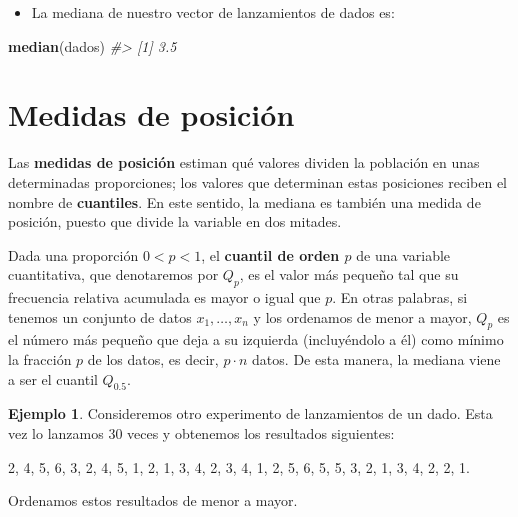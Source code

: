 \documentclass[
]{book}
\newenvironment{Shaded}{\begin{snugshade}}{\end{snugshade}}
\newcommand{\CommentTok}[1]{\textcolor[rgb]{0.56,0.35,0.01}{\textit{#1}}}
\newcommand{\KeywordTok}[1]{\textcolor[rgb]{0.13,0.29,0.53}{\textbf{#1}}}
\newcommand{\NormalTok}[1]{#1}
\providecommand{\tightlist}{%
  \setlength{\itemsep}{0pt}\setlength{\parskip}{0pt}}
\theoremstyle{definition}
\theoremstyle{definition}
\newtheorem{example}{Ejemplo}[chapter]
\theoremstyle{definition}
\theoremstyle{remark}
\begin{document}
\begin{itemize}
\tightlist
\item
  La mediana de nuestro vector de lanzamientos de dados es:
\end{itemize}

\begin{Shaded}
\begin{Highlighting}[]
\KeywordTok{median}\NormalTok{(dados)}
\CommentTok{\#\textgreater{} [1] 3.5}
\end{Highlighting}
\end{Shaded}

\hypertarget{medidas-de-posiciuxf3n}{%
\section{Medidas de posición}\label{medidas-de-posiciuxf3n}}

Las \textbf{medidas de posición} estiman qué valores dividen la población en unas determinadas proporciones; los valores que determinan estas posiciones reciben el nombre de \textbf{cuantiles}. En este sentido, la mediana es también una medida de posición, puesto que divide la variable en dos mitades.

Dada una proporción \(0<p<1\), el \textbf{cuantil de orden \(p\)} de una variable cuantitativa, que denotaremos por \(Q_p\), es el valor más pequeño tal que su frecuencia relativa acumulada es mayor o igual que \(p\). En otras palabras, si tenemos un conjunto de datos \(x_1, \ldots, x_n\) y los ordenamos de menor a mayor, \(Q_p\) es el número más pequeño que deja a su izquierda (incluyéndolo a él) como mínimo la fracción \(p\) de los datos, es decir, \(p\cdot n\) datos.
De esta manera, la mediana viene a ser el cuantil \(Q_{0.5}\).

\begin{example}
\protect\hypertarget{exm:ex184}{}{\label{exm:ex184} }Consideremos otro experimento de lanzamientos de un dado. Esta vez lo lanzamos 30 veces y obtenemos los resultados siguientes:
\end{example}

2, 4, 5, 6, 3, 2, 4, 5, 1, 2, 1, 3, 4, 2, 3, 4, 1, 2, 5, 6, 5, 5, 3, 2, 1, 3, 4, 2, 2, 1.

Ordenamos estos resultados de menor a mayor.
\end{document}
